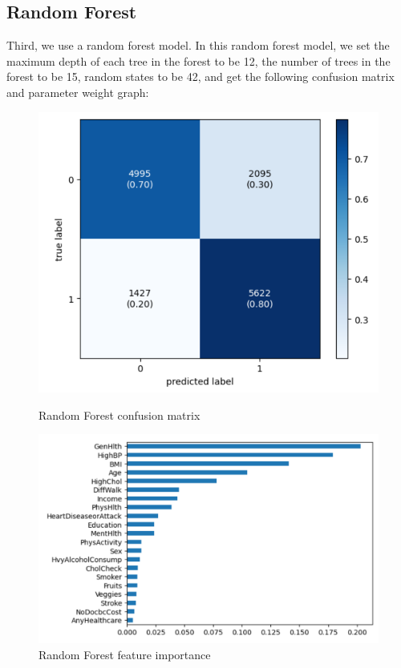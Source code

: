 \documentclass[12pt]{article}
\begin{document}
\subsection{Random Forest}
Third, we use a random forest model. In this random forest model, we set the maximum depth of each tree in the forest to be 12, the number of trees in the forest to be 15, random states to be 42, and get the following confusion matrix and parameter weight graph:
\begin{figure}[H]
  \centering
  \begin{minipage}[b]{0.45\textwidth}
    \centering
    \includegraphics[width=0.7\linewidth]{ranfor_cm.png}
    \caption{Random Forest confusion matrix}
  \end{minipage}\hfill
  \begin{minipage}[b]{0.45\textwidth}
    \centering
    \includegraphics[width=0.7\linewidth]{ranfor_w.png}
    \caption{Random Forest feature importance}
  \end{minipage}
\end{figure}
\end{document}
